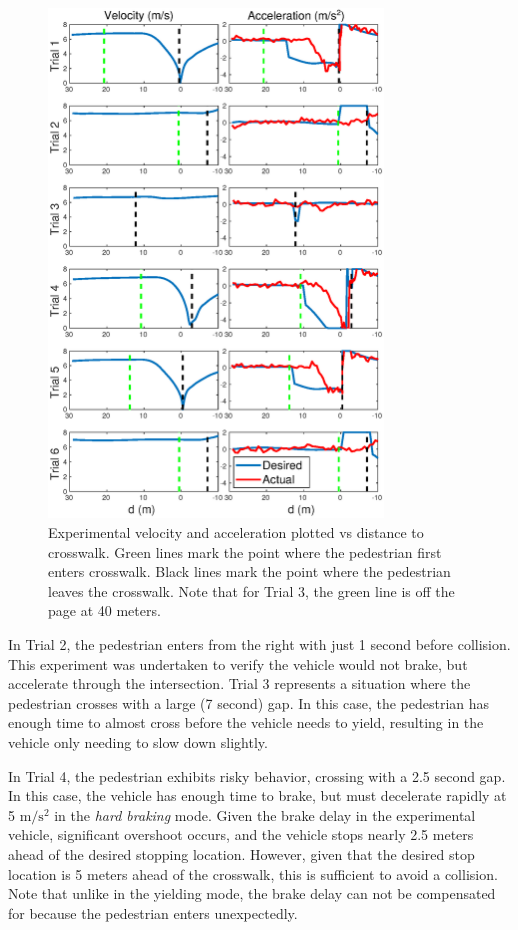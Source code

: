 \documentclass[letterpaper, 10 pt, conference]{ieeeconf}  %
\begin{document}
\begin{figure}[h]
\centering
\includegraphics[width=3.5in]{figures/expPlot.eps}
\caption{Experimental velocity and acceleration plotted vs distance to crosswalk. Green lines mark the point where the pedestrian first enters crosswalk. Black lines mark the point where the pedestrian leaves the crosswalk. Note that for Trial 3, the green line is off the page at 40 meters.}
\label{fig:expPlot}
\end{figure}

In Trial 2, the pedestrian enters from the right with just 1 second before collision. This experiment was undertaken to verify the vehicle would not brake, but accelerate through the intersection. Trial 3 represents a situation where the pedestrian crosses with a large (7 second) gap. In this case, the pedestrian has enough time to almost cross before the vehicle needs to yield, resulting in the vehicle only needing to slow down slightly. 

In Trial 4, the pedestrian exhibits risky behavior, crossing with a 2.5 second gap. In this case, the vehicle has enough time to brake, but must decelerate rapidly at 5 $\mathrm{m/s^2}$ in the \textit{hard braking} mode. Given the brake delay in the experimental vehicle, significant overshoot occurs, and the vehicle stops nearly 2.5 meters ahead of the desired stopping location. However, given that the desired stop location is 5 meters ahead of the crosswalk, this is sufficient to avoid a collision. Note that unlike in the yielding mode, the brake delay can not be compensated for because the pedestrian enters unexpectedly. 
\end{document}

